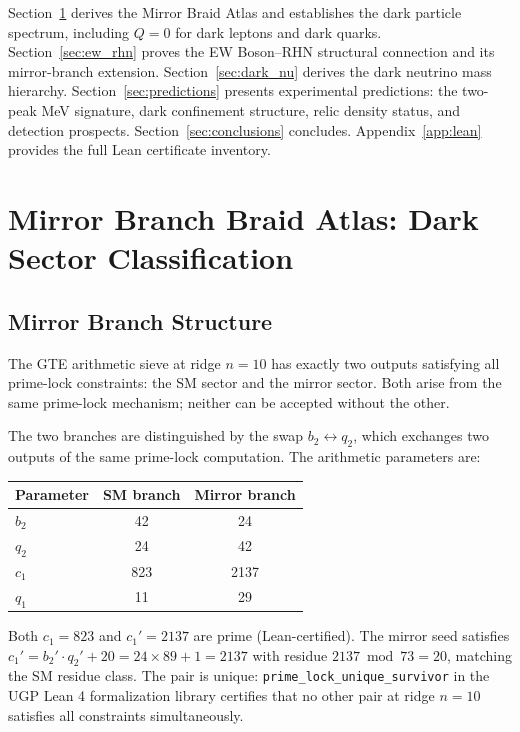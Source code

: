 \documentclass[11pt]{article}
\begin{document}
Section~\ref{sec:braid_atlas} derives the Mirror Braid Atlas and establishes the dark
particle spectrum, including $Q=0$ for dark leptons and dark quarks. Section~\ref{sec:ew_rhn}
proves the EW Boson--RHN structural connection and its mirror-branch extension.
Section~\ref{sec:dark_nu} derives the dark neutrino mass hierarchy.
Section~\ref{sec:predictions} presents experimental predictions: the two-peak MeV
signature, dark confinement structure, relic density status, and detection prospects.
Section~\ref{sec:conclusions} concludes. Appendix~\ref{app:lean} provides the full Lean
certificate inventory.

\section{Mirror Branch Braid Atlas: Dark Sector Classification}
\label{sec:braid_atlas}

\subsection{Mirror Branch Structure}
\label{ssec:mirror_branch}

The GTE arithmetic sieve at ridge $n=10$ has exactly two outputs satisfying all
prime-lock constraints: the SM sector and the mirror sector. Both arise from the same
prime-lock mechanism; neither can be accepted without the other.

The two branches are distinguished by the swap $b_2 \leftrightarrow q_2$, which
exchanges two outputs of the same prime-lock computation. The arithmetic parameters are:
\begin{center}
\begin{tabular}{lcc}
\toprule
Parameter & SM branch & Mirror branch \\
\midrule
$b_2$ & 42 & 24 \\
$q_2$ & 24 & 42 \\
$c_1$ & 823 & 2137 \\
$q_1$ & 11 & 29 \\
\bottomrule
\end{tabular}
\end{center}

Both $c_1 = 823$ and $c_1' = 2137$ are prime (Lean-certified). The mirror seed satisfies
$c_1' = b_2' \cdot q_2' + 20 = 24 \times 89 + 1 = 2137$ with residue $2137 \bmod 73 = 20$,
matching the SM residue class. The pair is unique: \texttt{prime\_lock\_unique\_survivor}
in the UGP Lean 4 formalization library \cite{SpivackUGPPhysicsLean} certifies that no other
pair at ridge $n=10$ satisfies all constraints simultaneously.
\end{document}
